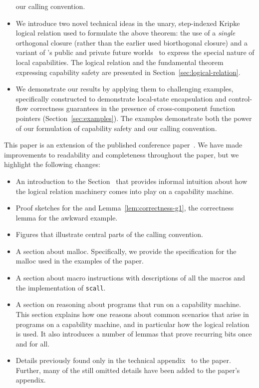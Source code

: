 \documentclass[format=acmsmall, review=true, screen=true]{acmart}
\renewcommand{\sectionname}{Section}
\newcommand\lau[1]{{\color{purple} \sf \footnotesize {LS: #1}}\\}
\renewcommand\lau[1]{}
\newenvironment{toplas}%
    {\color{OliveGreen}}{}
\begin{document}
\begin{itemize}
  our calling convention.
\item We introduce two novel technical ideas in the unary, step-indexed Kripke
  logical relation used to formulate the above theorem: the use of a
  \emph{single} orthogonal closure (rather than the earlier used biorthogonal
  closure) and a variant of \citet{Dreyer:jfp12}'s public and private future
  worlds~\citep{Dreyer:jfp12} to express the special nature of local
  capabilities. The logical relation and the fundamental theorem expressing
  capability safety are presented in \sectionname~\ref{sec:logical-relation}.
\item We demonstrate our results by applying them to challenging examples,
  specifically constructed to demonstrate local-state encapsulation and
  control-flow correctness guarantees in the presence of cross-component
  function pointers (\sectionname~\ref{sec:examples}). The examples demonstrate both
  the power of our formulation of capability safety and our calling convention.
\end{itemize}
\begin{toplas}
  This paper is an extension of the published conference paper~\citet{Skorstengaard:esop18}.
  We have made improvements to readability and completeness throughout the paper, but we highlight the following changes:
  \begin{itemize}
  \item An introduction to the \sectionname~ that provides informal intuition about how the logical relation machinery comes into play on a capability machine.
  \item Proof sketches for the  and Lemma~\ref{lem:correctness-g1}, the correctness lemma for the awkward example.
  \item Figures that illustrate central parts of the calling convention.
  \item A section about malloc.
    Specifically, we provide the specification for the malloc used in the examples of the paper.
  \item A section about macro instructions with descriptions of all the macros and the implementation of \texttt{scall}.
  \item A section on reasoning about programs that run on a capability machine.
    This section explains how one reasons about common scenarios that arise in programs on a capability machine, and in particular how the logical relation is used.
    It also introduces a number of lemmas that prove recurring bits once and for all.
  \item Details previously found only in the technical appendix~\citep{technical_appendix} to the paper.
    Further, many of the still omitted details have been added to the paper's appendix.
  \end{itemize}
\end{toplas}
\end{document}
